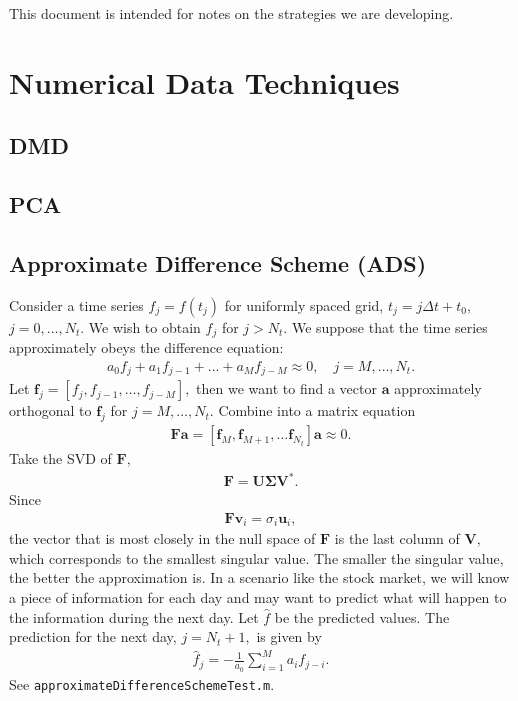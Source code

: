 



This document is intended for notes on the strategies we are developing.

\section{Numerical Data Techniques}

\subsection{DMD}

\subsection{PCA}

\subsection{Approximate Difference Scheme (ADS)}

Consider a time series $f_j = f(t_j)$ for uniformly spaced
grid, $t_j = j \Delta t + t_0,$ $j = 0, \dots, N_t.$ We wish to obtain
$f_j$ for $j > N_t.$ We suppose that the time series approximately obeys
the difference equation:
\begin{align}
a_0 f_j + a_1 f_{j-1} + ... + a_{M} f_{j-M} \approx 0, \quad j = M, \dots, N_t.
\end{align}
%
Let $\textbf{f}_j = [f_j, f_{j-1}, \dots, f_{j-M}],$ then we want to find a vector 
$\textbf{a}$ approximately orthogonal to $\textbf{f}_j$ for $j = M, \dots, N_t.$
Combine into a matrix equation
\begin{align}
\textbf{F} \textbf{a} = 
[\textbf{f}_M, \textbf{f}_{M+1}, \dots \textbf{f}_{N_t}] \textbf{a} \approx 0.
\end{align}
%
Take the SVD of $\textbf{F},$
\begin{align}
\textbf{F} = \textbf{U} \boldsymbol{\Sigma} \textbf{V}^*.
\end{align}
% 
Since
\begin{align}
\textbf{F} \textbf{v}_i = \sigma_i \textbf{u}_i,
\end{align}
%
the vector that is most closely in the null space of $\textbf{F}$ is 
the last column of $\textbf{V},$ which corresponds to the smallest singular value. 
The smaller the singular value, the better the approximation is. In a scenario 
like the stock market, we will know a piece of information for
each day and may want to predict what will happen to the information during the next day.
Let $\hat{f}$ be the predicted values. The prediction for the next day, $j = N_t+1,$ is
given by
\begin{align}
\hat{f}_{j} = -\frac{1}{a_0}\sum_{i = 1}^{M} a_i f_{j-i}.
\end{align}
%
See \lstinline{approximateDifferenceSchemeTest.m}.

